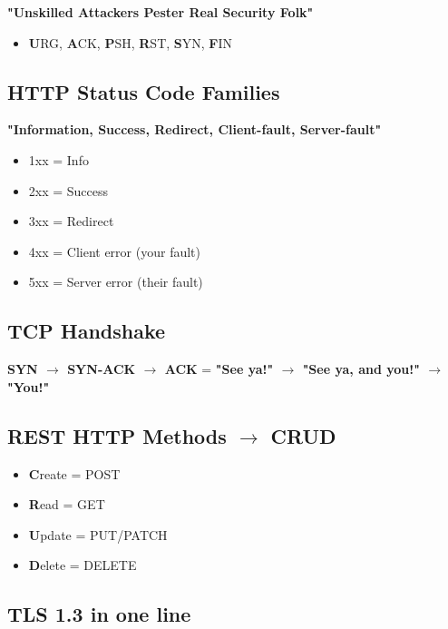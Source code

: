 \documentclass[11pt]{article}
\providecommand{\tightlist}{\setlength{\itemsep}{1pt}\setlength{\parskip}{0pt}}
\begin{document}
\textbf{"Unskilled Attackers Pester Real Security Folk"}

\begin{itemize}
\tightlist
\item
  \textbf{U}RG, \textbf{A}CK, \textbf{P}SH, \textbf{R}ST, \textbf{S}YN, \textbf{F}IN
\end{itemize}

\subsection{HTTP Status Code Families}\label{http-status-code-families}

\textbf{"Information, Success, Redirect, Client-fault, Server-fault"}

\begin{itemize}
\tightlist
\item
  1xx = Info
\item
  2xx = Success
\item
  3xx = Redirect
\item
  4xx = Client error (your fault)
\item
  5xx = Server error (their fault)
\end{itemize}

\subsection{TCP Handshake}\label{tcp-handshake}

\textbf{SYN \(\rightarrow\) SYN-ACK \(\rightarrow\) ACK} = \textbf{"See ya!" \(\rightarrow\) "See ya, and you!" \(\rightarrow\) "You!"}

\subsection{\texorpdfstring{REST HTTP Methods \(\rightarrow\) CRUD}{REST HTTP Methods \textbackslash rightarrow CRUD}}\label{rest-http-methods-rightarrow-crud}

\begin{itemize}
\tightlist
\item
  \textbf{C}reate = POST
\item
  \textbf{R}ead = GET
\item
  \textbf{U}pdate = PUT/PATCH
\item
  \textbf{D}elete = DELETE
\end{itemize}

\subsection{TLS 1.3 in one line}\label{tls-13-in-one-line}
\end{document}
